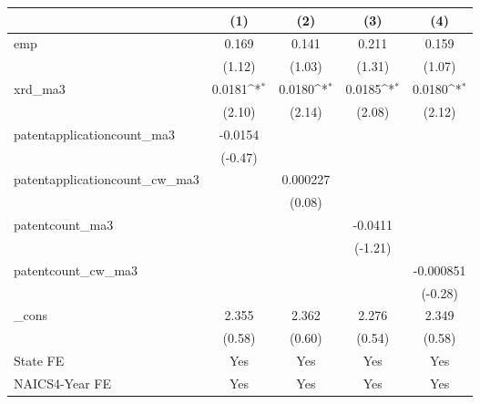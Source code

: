 {
\def\sym#1{\ifmmode^{#1}\else\(^{#1}\)\fi}
\begin{tabular}{l*{4}{c}}
\hline\hline
            &\multicolumn{1}{c}{(1)}         &\multicolumn{1}{c}{(2)}         &\multicolumn{1}{c}{(3)}         &\multicolumn{1}{c}{(4)}         \\
\hline
emp         &       0.169         &       0.141         &       0.211         &       0.159         \\
            &      (1.12)         &      (1.03)         &      (1.31)         &      (1.07)         \\
[1em]
xrd\_ma3     &      0.0181\sym{*}  &      0.0180\sym{*}  &      0.0185\sym{*}  &      0.0180\sym{*}  \\
            &      (2.10)         &      (2.14)         &      (2.08)         &      (2.12)         \\
[1em]
patentapplicationcount\_ma3&     -0.0154         &                     &                     &                     \\
            &     (-0.47)         &                     &                     &                     \\
[1em]
patentapplicationcount\_cw\_ma3&                     &    0.000227         &                     &                     \\
            &                     &      (0.08)         &                     &                     \\
[1em]
patentcount\_ma3&                     &                     &     -0.0411         &                     \\
            &                     &                     &     (-1.21)         &                     \\
[1em]
patentcount\_cw\_ma3&                     &                     &                     &   -0.000851         \\
            &                     &                     &                     &     (-0.28)         \\
[1em]
\_cons      &       2.355         &       2.362         &       2.276         &       2.349         \\
            &      (0.58)         &      (0.60)         &      (0.54)         &      (0.58)         \\
[1em]
State FE    &         Yes         &         Yes         &         Yes         &         Yes         \\
[1em]
NAICS4-Year FE&         Yes         &         Yes         &         Yes         &         Yes         \\

\end{tabular}}
